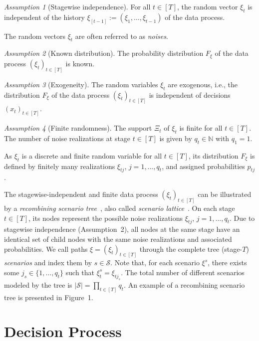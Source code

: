\documentclass{article}
\theoremstyle{remark}
\newtheorem{assumption}{Assumption}
\begin{document}
\begin{assumption}[Stagewise independence]
For all $t \in [T]$, the random vector $\xi_t$ is independent of the history 
$\xi_{[t-1]} := (\xi_1,\ldots,\xi_{t-1})$ of the data process.
\end{assumption}

The random vectors $\xi_t$ are often referred to as \emph{noises}. 

\begin{assumption}[Known distribution]
The probability distribution $F_{\xi}$ of the data process $(\xi_t)_{t\in[T]}$ is known.
\end{assumption}

\begin{assumption}[Exogeneity]
The random variables $\xi_t$ are exogenous, i.e., the distribution $F_{\xi}$ of the data 
process $(\xi_t)_{t\in[T]}$ is independent of decisions $(x_t)_{t\in[T]}$.
\end{assumption}

\begin{assumption}[Finite randomness]
The support $\Xi_t$ of $\xi_t$ is finite for all $t \in [T]$. The number of noise 
realizations at stage $t \in [T]$ is given by $q_t \in \mathbb{N}$ with $q_1 = 1$.
\end{assumption}

As $\xi_t$ is a discrete and finite random variable for all $t \in [T]$, its distribution $F_{\xi}$ is defined by finitely many realizations $\xi_{tj}$, $j = 1,\ldots,q_t$, and assigned probabilities $p_{tj}$.

The stagewise-independent and finite data process $(\xi_t)_{t\in[T]}$ can be illustrated 
by a \emph{recombining scenario tree}~\cite{185}, also called \emph{scenario lattice}~\cite{136}. 
On each stage $t \in [T]$, its nodes represent the possible noise realizations 
$\xi_{tj}$, $j = 1,\ldots,q_t$. Due to stagewise independence (Assumption~2), all nodes 
at the same stage have an identical set of child nodes with the same noise realizations 
and associated probabilities. We call paths $\xi = (\xi_t)_{t\in[T]}$ through the 
complete tree (stage-$T$) \emph{scenarios} and index them by $s \in \mathcal{S}$. Note 
that, for each scenario $\xi^s$, there exists some $j_s \in \{1,\ldots,q_t\}$ such that 
$\xi_t^s = \xi_{t j_s}$. The total number of different scenarios modeled by the tree is
$|\mathcal{S}| = \prod_{t \in [T]} q_t$. An example of a recombining scenario tree is 
presented in Figure~1.

\section{Decision Process}
\end{document}
